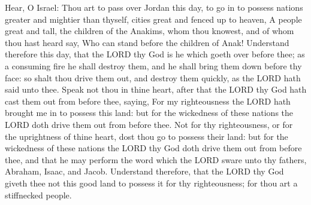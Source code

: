  Hear, O Israel: Thou art to pass over Jordan this day, to
go in to possess nations greater and mightier than thyself, cities great
and fenced up to heaven,  A people great and tall, the
children of the Anakims, whom thou knowest, and of whom thou hast heard
say, Who can stand before the children of Anak!  Understand
therefore this day, that the LORD thy God is he which goeth over before
thee; as a consuming fire he shall destroy them, and he shall bring them
down before thy face: so shalt thou drive them out, and destroy them
quickly, as the LORD hath said unto thee.  Speak not thou in
thine heart, after that the LORD thy God hath cast them out from before
thee, saying, For my righteousness the LORD hath brought me in to
possess this land: but for the wickedness of these nations the LORD doth
drive them out from before thee.  Not for thy righteousness,
or for the uprightness of thine heart, dost thou go to possess their
land: but for the wickedness of these nations the LORD thy God doth
drive them out from before thee, and that he may perform the word which
the LORD sware unto thy fathers, Abraham, Isaac, and Jacob. 
Understand therefore, that the LORD thy God giveth thee not this good
land to possess it for thy righteousness; for thou art a stiffnecked
people.

